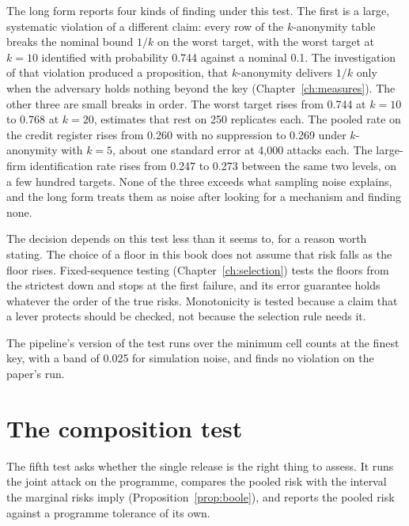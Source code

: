 The long form reports four kinds of finding under this test. The first is a large,
systematic violation of a different claim: every row of the $k$-anonymity table
breaks the nominal bound $1/k$ on the worst target, with the worst target at
$k = 10$ identified with probability 0.744 against a nominal 0.1.
The investigation of that violation produced a proposition, that $k$-anonymity
delivers $1/k$ only when the adversary holds nothing beyond the key
(Chapter~\ref{ch:measures}). The other three are small breaks in order. The worst
target rises from 0.744 at $k = 10$ to 0.768 at $k = 20$, estimates that rest on 250
replicates each. %
The pooled rate on the credit register rises from 0.260 with no suppression to
0.269 under $k$-anonymity with $k = 5$, about one standard error at 4{,}000 attacks
each. %
The large-firm identification rate rises from 0.247 to 0.273 between the same two
levels, on a few hundred targets. %
None of the three exceeds what sampling noise explains, and the long form treats
them as noise after looking for a mechanism and finding none.

The decision depends on this test less than it seems to, for a reason worth stating.
The choice of a floor in this book does not assume that risk falls as the floor
rises. Fixed-sequence testing (Chapter~\ref{ch:selection}) tests the floors from the
strictest down and stops at the first failure, and its error guarantee holds
whatever the order of the true risks. Monotonicity is tested because a claim that a
lever protects should be checked, not because the selection rule needs it.

The pipeline's version of the test runs over the minimum cell counts at the finest
key, with a band of 0.025 for simulation noise, and finds no violation on the paper's
run. %

\section{The composition test}

The fifth test asks whether the single release is the right thing to assess. It runs
the joint attack on the programme, compares the pooled risk with the interval the
marginal risks imply (Proposition~\ref{prop:boole}), and reports the pooled risk
against a programme tolerance of its own.

